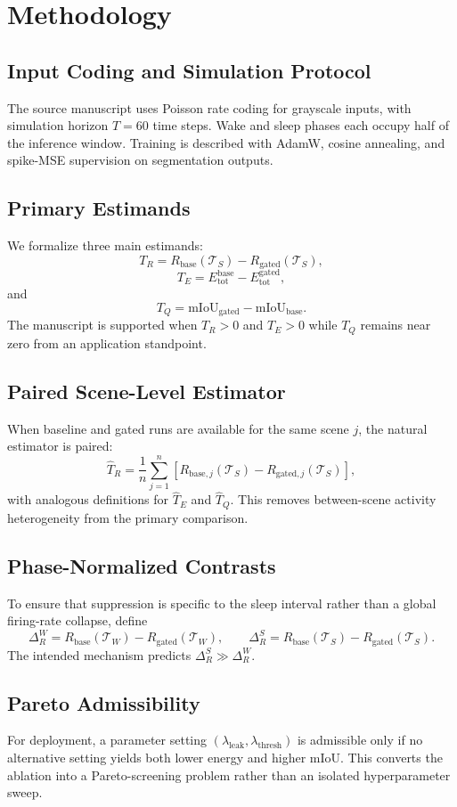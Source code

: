 \documentclass[11pt]{article}
\begin{document}
\section{Methodology}
\subsection{Input Coding and Simulation Protocol}
The source manuscript uses Poisson rate coding for grayscale inputs, with simulation horizon $T=60$ time steps. Wake and sleep phases each occupy half of the inference window. Training is described with AdamW, cosine annealing, and spike-MSE supervision on segmentation outputs.

\subsection{Primary Estimands}
We formalize three main estimands:
\[
T_R = R_{\mathrm{base}}(\mathcal{T}_S)-R_{\mathrm{gated}}(\mathcal{T}_S),
\]
\[
T_E = E_{\mathrm{tot}}^{\mathrm{base}}-E_{\mathrm{tot}}^{\mathrm{gated}},
\]
and
\[
T_Q = \mathrm{mIoU}_{\mathrm{gated}}-\mathrm{mIoU}_{\mathrm{base}}.
\]
The manuscript is supported when $T_R>0$ and $T_E>0$ while $T_Q$ remains near zero from an application standpoint.

\subsection{Paired Scene-Level Estimator}
When baseline and gated runs are available for the same scene $j$, the natural estimator is paired:
\[
\widehat{T}_R=\frac{1}{n}\sum_{j=1}^{n}\left[
R_{\mathrm{base},j}(\mathcal{T}_S)-R_{\mathrm{gated},j}(\mathcal{T}_S)
\right],
\]
with analogous definitions for $\widehat{T}_E$ and $\widehat{T}_Q$. This removes between-scene activity heterogeneity from the primary comparison.

\subsection{Phase-Normalized Contrasts}
To ensure that suppression is specific to the sleep interval rather than a global firing-rate collapse, define
\[
\Delta_R^{W}=R_{\mathrm{base}}(\mathcal{T}_W)-R_{\mathrm{gated}}(\mathcal{T}_W),
\qquad
\Delta_R^{S}=R_{\mathrm{base}}(\mathcal{T}_S)-R_{\mathrm{gated}}(\mathcal{T}_S).
\]
The intended mechanism predicts $\Delta_R^{S}\gg \Delta_R^{W}$.

\subsection{Pareto Admissibility}
For deployment, a parameter setting $(\lambda_{\mathrm{leak}},\lambda_{\mathrm{thresh}})$ is admissible only if no alternative setting yields both lower energy and higher mIoU. This converts the ablation into a Pareto-screening problem rather than an isolated hyperparameter sweep.
\end{document}
